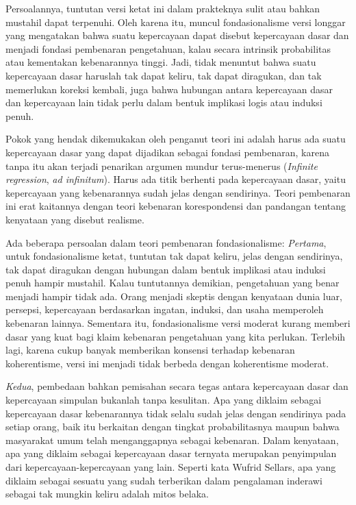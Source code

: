 \documentclass[10pt,a4paper]{article}
\begin{document}
\begin{multicols}{2}
Persoalannya, tuntutan versi ketat ini dalam prakteknya sulit atau
bahkan mustahil dapat terpenuhi. Oleh karena itu, muncul fondasionalisme
versi longgar yang mengatakan bahwa suatu kepercayaan dapat disebut
kepercayaan dasar dan menjadi fondasi pembenaran pengetahuan, kalau
secara intrinsik probabilitas atau kementakan kebenarannya tinggi. Jadi,
tidak menuntut bahwa suatu kepercayaan dasar haruslah tak dapat keliru,
tak dapat diragukan, dan tak memerlukan koreksi kembali, juga bahwa
hubungan antara kepercayaan dasar dan kepercayaan lain tidak perlu dalam
bentuk implikasi logis atau induksi penuh.

Pokok yang hendak dikemukakan oleh penganut teori ini adalah harus ada
suatu kepercayaan dasar yang dapat dijadikan sebagai fondasi pembenaran,
karena tanpa itu akan terjadi penarikan argumen mundur terus-menerus
(\emph{Infinite regression}, \emph{ad infinitum}). Harus ada titik
berhenti pada kepercayaan dasar, yaitu kepercayaan yang kebenarannya
sudah jelas dengan sendirinya. Teori pembenaran ini erat kaitannya
dengan teori kebenaran korespondensi dan pandangan tentang kenyataan
yang disebut realisme.

Ada beberapa persoalan dalam teori pembenaran fondasionalisme:
\emph{Pertama}, untuk fondasionalisme ketat, tuntutan tak dapat keliru,
jelas dengan sendirinya, tak dapat diragukan dengan hubungan dalam
bentuk implikasi atau induksi penuh hampir mustahil. Kalau tuntutannya
demikian, pengetahuan yang benar menjadi hampir tidak ada. Orang menjadi
skeptis dengan kenyataan dunia luar, persepsi, kepercayaan berdasarkan
ingatan, induksi, dan usaha memperoleh kebenaran lainnya. Sementara itu,
fondasionalisme versi moderat kurang memberi dasar yang kuat bagi klaim
kebenaran pengetahuan yang kita perlukan. Terlebih lagi, karena cukup
banyak memberikan konsensi terhadap kebenaran koherentisme, versi ini
menjadi tidak berbeda dengan koherentisme moderat.

\emph{Kedua}, pembedaan bahkan pemisahan secara tegas antara kepercayaan
dasar dan kepercayaan simpulan bukanlah tanpa kesulitan. Apa yang
diklaim sebagai kepercayaan dasar kebenarannya tidak selalu sudah jelas
dengan sendirinya pada setiap orang, baik itu berkaitan dengan tingkat
probabilitasnya maupun bahwa masyarakat umum telah menganggapnya sebagai
kebenaran. Dalam kenyataan, apa yang diklaim sebagai kepercayaan dasar
ternyata merupakan penyimpulan dari kepercayaan-kepercayaan yang lain.
Seperti kata Wufrid Sellars, apa yang diklaim sebagai sesuatu yang sudah
terberikan dalam pengalaman inderawi sebagai tak mungkin keliru adalah
mitos belaka.


\end{multicols}
\end{document}
